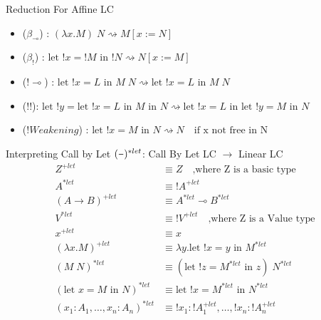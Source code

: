 \documentclass[10pt]{beamer}
\newcommand{\lam}[2]{\lambda #1 . #2}
\newcommand{\llet}[3]{\text{let }  ! #1 = #2 \text{ in } #3}
\newcommand{\plet}[3]{\text{let }   #1 = #2 \text{ in } #3}
\newcommand{\app}[2]{#1 \; #2}
\newcommand{\subst}[2]{[#1 := #2]}
\newcommand{\minus}{\scalebox{0.75}[1.0]{$-$}}
\begin{document}
\begin{frame}{Reduction For Affine LC}
  \begin{itemize}
    \item ($\beta_{\multimap}$) : $\app{(\lam{x}{M})}{N} \rightsquigarrow M \subst{x}{N}$
    \item ($\beta_{!}$) : $\llet{x}{! M}{! N} \rightsquigarrow N \subst{x}{M}$
    \item ($! \multimap$) : $\app{\llet{x}{L}{M}}{N}  \rightsquigarrow \llet{x}{L}{\app{M}{N}}$
    \item ($! !$): $\llet{y}{\llet{x}{L}{M}}{N} \rightsquigarrow \llet{x}{L}{\llet{y}{M}{N}}$
    \item ($! Weakening$) : $\llet{x}{M}{N} \rightsquigarrow N \quad \text{if x not free in N}$
  \end{itemize}
\end{frame}

\begin{frame}[fragile]{Interpreting Call by Let}
  $(\minus)^{*let}$: Call By Let LC $\to$ Linear LC\\
  \begin{align*}
    Z^{+let}                             & \equiv Z \quad \text{,where Z is a basic type}           \\
    A^{*let}                             & \equiv ! A^{+let}                                        \\
    (A \rightarrow B)^{+let}             & \equiv A^{*let} \multimap B^{*let}                       \\
    V^{*let}                             & \equiv ! V^{+let} \quad \text{,where Z is a Value type}  \\
    x^{+let}                             & \equiv x                                                 \\
    (\lam{x}{M})^{+let}                  & \equiv \lam{y}{\llet{x}{y}{M^{*let}}}                    \\
    (\app{M}{N})^{*let}                  & \equiv \app{(\llet{z}{M^{*let}}{z})}{N^{*let}}           \\
    (\plet{x}{M}{N})^{*let}              & \equiv \llet{x}{M^{*let}}{N^{*let}}                      \\
    (x_1 : A_1, \dots, x_n : A_n)^{*let} & \equiv ! x_1 : ! A_1^{+let}, \dots, ! x_n : ! A_n^{+let} \\
  \end{align*}
\end{frame}
\end{document}
